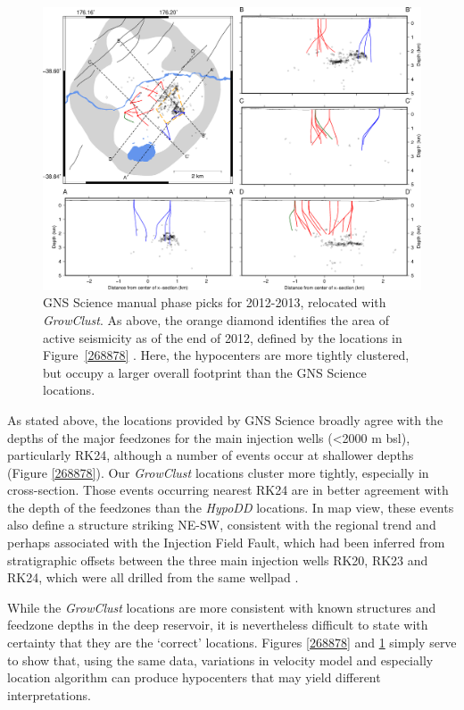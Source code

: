\begin{figure}[h!]
\begin{center}
\includegraphics[width=0.98\columnwidth]{Chapter_4_Rot/figures/merc_Rot_GNS_GC1/merc_Rot_GNS_GC1_original}
\caption{{GNS Science manual phase picks for 2012-2013, relocated with
\emph{GrowClust}. As above, the orange diamond identifies the area of
active seismicity as of the end of 2012, defined by the locations in
Figure~{\ref{268878}} . Here, the hypocenters are more
tightly clustered, but occupy a larger overall footprint than the GNS
Science locations.
{\label{849365}}%
}}
\end{center}
\end{figure}

As stated above, the locations provided by GNS Science broadly agree with the depths of the major feedzones for the main injection wells (\textless2000 m bsl), particularly RK24, although a number of events occur at shallower depths (Figure \ref{268878}). Our \textit{GrowClust} locations cluster more tightly, especially in cross-section. Those events occurring nearest RK24 are in better agreement with the depth of the feedzones than the \textit{HypoDD} locations. In map view, these events also define a structure striking NE-SW, consistent with the regional trend and perhaps associated with the Injection Field Fault, which had been inferred from stratigraphic offsets between the three main injection wells RK20, RK23 and RK24, which were all drilled from the same wellpad \citep{Sewell_2015}.

While the \textit{GrowClust} locations are more consistent with known structures and feedzone depths in the deep reservoir, it is nevertheless difficult to state with certainty that they are the `correct' locations. Figures \ref{268878} and \ref{849365} simply serve to show that, using the same data, variations in velocity model and especially location algorithm can produce hypocenters that may yield different interpretations.